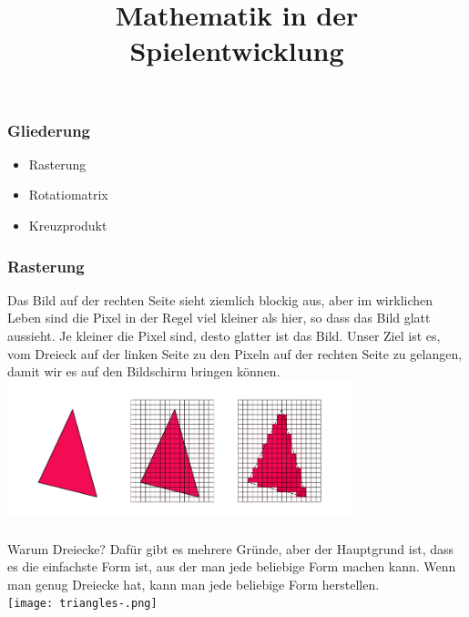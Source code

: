 \documentclass{beamer}
\title{Mathematik in der Spielentwicklung}
\date{}
\author{}  %
\institute{}  %
\begin{document}
	
	\maketitle
	
\begin{frame}
	\frametitle{Gliederung}
	\centering
	\begin{minipage}{0.5\textwidth}
		\centering
	\end{minipage}%
	\begin{minipage}{0.45\textwidth}
		\begin{itemize}
			\item Rasterung
			\item Rotatiomatrix
			\item Kreuzprodukt
		\end{itemize}
	\end{minipage}
\end{frame}

\begin{frame}
	\frametitle{Rasterung}
		\textmd{\small Das Bild auf der rechten Seite sieht ziemlich blockig aus, aber im wirklichen Leben sind die Pixel in der Regel viel kleiner als hier, so dass das Bild glatt aussieht. Je kleiner die Pixel sind, desto glatter ist das Bild. Unser Ziel ist es, vom Dreieck auf der linken Seite zu den Pixeln auf der rechten Seite zu gelangen, damit wir es auf den Bildschirm bringen können.} \\
		\vspace{0.3cm} %
		\centering
		\includegraphics[width=10cm]{raster-.png}

\end{frame}

\begin{frame}
	\frametitle{\phantom{}}
	\vspace{-1cm}
	\textmd{\small Warum Dreiecke? Dafür gibt es mehrere Gründe, aber der Hauptgrund ist, dass es die einfachste Form ist, aus der man jede beliebige Form machen kann. Wenn man genug Dreiecke hat, kann man jede beliebige Form herstellen.} \\
	\vspace{0.3cm} %
	\centering
	\texttt{[image: triangles-.png]}

\end{frame}
\end{document}
